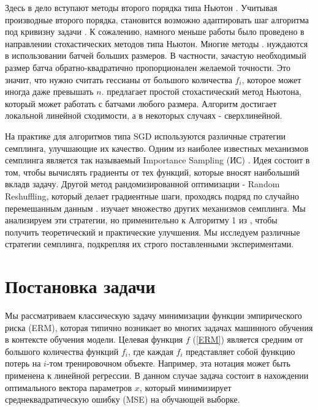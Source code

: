 \documentclass{article}
\theoremstyle{definition}
\theoremstyle{assumption}
\theoremstyle{lemma}
\theoremstyle{theorem}
\theoremstyle{proposition}
\begin{document}
	Здесь в дело вступают методы второго порядка типа Ньютон \cite{Nesterov-introductory, Newton-convergence, RSN}. Учитывая производные второго порядка, становится возможно адаптировать шаг алгоритма под кривизну задачи \cite{Nesterov-introductory}. К сожалению, намного меньше работы было проведено в направлении стохастических методов типа Ньютон. Многие методы \cite{sub-sampled, exact-inexact, variance-reduced-Newton, zhang2022adaptive, tripuraneni2018stochastic, zhou2020stochastic}. нуждаются в использовании батчей больших размеров. В частности, зачастую необходимый размер батча обратно-квадратично пропорционален желаемой точности. Это значит, что нужно считать гессианы от большого количества $f_i$, которое может иногда даже превышать $n$. \cite{kovalev2019stochastic} предлагает простой стохастический метод Ньютона, который может работать с батчами любого размера. Алгоритм достигает локальной линейной сходимости, а в некоторых случаях - сверхлинейной. 
	
	На практике для алгоритмов типа SGD используются различные стратегии семплинга, улучшающие их качество. Одним из наиболее известных механизмов семплинга является так называемый Importance Sampling (ИС) \cite{gower2019sgd, https://doi.org/10.48550/arxiv.1401.2753, 9413313}. Идея состоит в том, чтобы вычислять градиенты от тех функций, которые вносят наибольший вкладв задачу. Другой метод рандомизированной оптимизации - Random Reshuffling, который делает градиентные шаги, проходясь подряд по случайно перемешанным данным \cite{mishchenko2020random}.
	 \cite{richtarik2016parallel} изучает множество других механизмов семплинга. Мы анализируем эти стратегии, но применительно к Алгоритму 1 из \cite{kovalev2019stochastic}, чтобы получить теоретический и практические улучшения. Мы исследуем различные стратегии семплинга, подкрепляя их строго поставленными экспериментами.
	 
	\section{Постановка задачи}
	
	Мы рассматриваем классическую задачу минимизации функции эмпирического риска (ERM), которая типично возникает во многих задачах машинного обучения в контексте обучения модели. Целевая функция $f$ (\ref{ERM}) является средним от большого количества функций $f_i$, где каждая $f_i$ представляет собой функцию потерь на $i$-том тренировочном объекте. Например, эта нотация может быть применена к линейной регрессии. В данном случае задача состоит в нахождении оптимального вектора параметров $x$, который минимизирует среднеквадратическую ошибку (MSE) на обучающей выборке.
	
\end{document}

